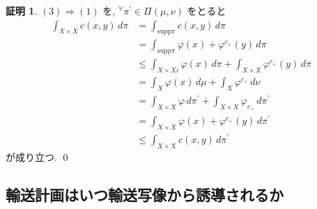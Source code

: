 \documentclass[10pt, fleqn, label-section=none, titlepage]{bxjsarticle}
\theoremstyle{definition}
\newtheorem*{pf*}{証明}
\newcommand{\any}{{}^{\forall}}
\newcommand{\naraba}{\Rightarrow}
\newcommand{\supp}{\textrm{supp}}
\renewcommand{\;}{\, ; \,}
\renewcommand{\d}{\, {d}}
\begin{document}
\begin{pf*}
$(3) \naraba (1)$ を, $\any \pi^\prime \in \Pi (\mu, \nu)$ をとると 
\begin{align*} \int_{X \times X} c(x,y) \d \pi &= \int_{\supp \pi} c(x,y) \d \pi \\
&= \int_{\supp \pi} \varphi (x) + \varphi^{c_+} (y) \d \pi \\
&\leq \int_{X \times Xi} \varphi(x) \d \pi + \int_{X\times X} \varphi^{c_+} (y) \d \pi \\
&= \int_X \varphi(x) \d \mu + \int_X \varphi^{c_+} \d \nu \\
&= \int_{X \times X} \varphi \d \pi^\prime + \int_{X \times X} \varphi_{c_+} \d \pi ^\prime  \\
&= \int_{X \times X} \varphi (x) + \varphi^{c_+} (y) \d \pi ^\prime \\
&\leq \int_{X \times X} c (x,y) \d \pi^\prime \end{align*}
が成り立つ. 
\qed

\end{pf*}


\newpage
\subsection{輸送計画はいつ輸送写像から誘導されるか}
\end{document}
